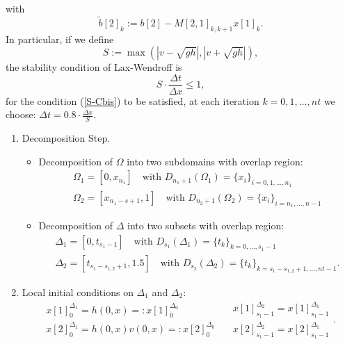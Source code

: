 with 
\begin{equation}\label{tilde_b[2]}
\tilde{b}[2]_{k}:={b}[2]-M[2,1]_{k,k+1}x[1]_{k}.
\end{equation}
In particular, if we define 
\begin{equation}\label{S-C}
S:=\max \left(|v-\sqrt{gh}|,|v+\sqrt{gh}|\right),
\end{equation}
the stability condition of  Lax-Wendroff is
\begin{equation}\label{S-Cbis}
S\cdot \frac{\Delta t}{\Delta x} \le 1,
\end{equation}
for the condition (\ref{S-Cbis}) to be satisfied, at each iteration $k=0,1,\ldots,nt$ we choose: $\Delta t=0.8\cdot \frac{\Delta x}{S}$.
\\
\begin{enumerate}
\item Decomposition Step.
\begin{itemize}
\item Decomposition of  $\Omega$ into two subdomains with overlap region:
\begin{equation}
\begin{array}{ll} 
\Omega_{1}=[0,x_{n_{1}}] \quad \textrm{with $D_{n_{1}+1}(\Omega_1)=\{x_{i}\}_{i=0,1,\ldots,n_1}$ }\\
\Omega_{2}=[x_{n_{1}-s+1},1] \quad  \textrm{with $D_{n_{2}+1}({\Omega}_{2})=\{x_{i}\}_{i=n_{1},\ldots,n-1}$}
\end{array}
\end{equation}
\item Decomposition of  $\Delta$ into two subsets with overlap region:
\begin{equation}
\begin{array}{ll}
\Delta_{1}=[0,t_{s_{1}-1}] \quad \textrm{with $D_{s_{1}}(\Delta_{1})=\{t_{k}\}_{k=0,\ldots,s_{1}-1}$}  \\
\Delta_{2}=[t_{s_{1}-s_{1,2}+1},1.5] \quad  \textrm{with $D_{s_{2}}(\Delta_{2})=\{t_{k}\}_{k=s_{1}-s_{1,2}+1,\ldots,nt-1}$}.
\end{array}
\end{equation}
\end{itemize}
\item Local initial conditions on  $\Delta_{1}$ and $\Delta_{2}$:
\begin{equation}
\begin{array}{ll}
x[1]_{0}^{\Delta_{1}}=h(0,x)=:x[1]_{0}^{\Delta_{0}}\\
x[2]_{0}^{\Delta_{1}}=h(0,x)v(0,x)=:x[2]_{0}^{\Delta_{0}}
\end{array}\quad
\begin{array}{ll}
x[1]_{{s_{1}-1}}^{\Delta_{2}}=x[1]_{{s_{1}-1}}^{\Delta_{1}}\\
x[2]_{{s_{1}-1}}^{\Delta_{2}}=x[2]_{{s_{1}-1}}^{\Delta_{1}}
\end{array}.
\end{equation}
 

\end{enumerate}
